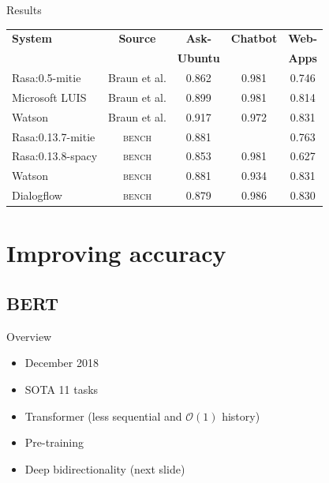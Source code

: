 \documentclass[pdf]{beamer}
\begin{document}
    \begin{frame}{Results}
        \hspace*{-6mm}
        \begin{tabular}{l c c c c}
            \textbf{System} & \textbf{Source} & \textbf{Ask-} & \textbf{Chatbot} & \textbf{Web-} \\
            & & \textbf{Ubuntu} & & \textbf{Apps} \\
            \hline
            Rasa:0.5-mitie & Braun et al. & 0.862 & 0.981 & 0.746 \\
            Microsoft LUIS & Braun et al. & 0.899 & 0.981 & 0.814 \\
            Watson & Braun et al. & 0.917 & 0.972 & 0.831 \\
            Rasa:0.13.7-mitie & \textsc{bench} & 0.881 & & 0.763 \\
            Rasa:0.13.8-spacy & \textsc{bench} & 0.853 & 0.981 & 0.627 \\
            Watson & \textsc{bench} & 0.881 & 0.934 & 0.831 \\
            Dialogflow & \textsc{bench} & 0.879 & 0.986 & 0.830 \\ 
            \hline
        \end{tabular}
    \end{frame}

    \section{Improving accuracy}

    \subsection{BERT}
    \begin{frame}{Overview}
        \begin{itemize}
            \item December 2018
            \item SOTA 11 tasks\\[5mm]

            \item Transformer (less sequential and $\mathcal{O} (1)$ history)
            \item Pre-training
            \item Deep bidirectionality (next slide)
        \end{itemize}
    \end{frame}
\end{document}
